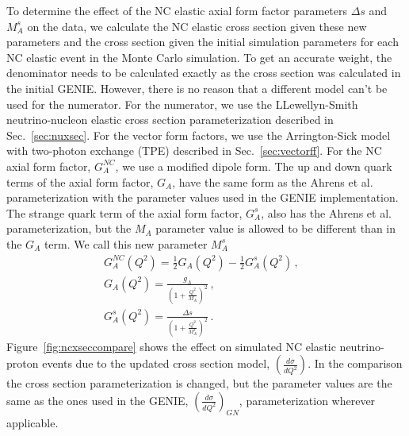     To determine the effect of the NC elastic axial form factor parameters
    $\Delta s$ and $M_A^s$ on the data, we calculate the NC elastic cross
    section given these new parameters and the cross section given the initial
    simulation parameters for each NC elastic event in the Monte Carlo
    simulation. To get an accurate weight, the denominator needs to be
    calculated exactly as the cross section was calculated in the initial
    GENIE. However, there is no reason that a different model can't be used for
    the numerator. For the numerator, we use the LLewellyn-Smith
    neutrino-nucleon elastic cross section parameterization described in
    Sec.~\ref{sec:nuxsec}. For the vector form factors, we use the
    Arrington-Sick model with two-photon exchange (TPE) described in
    Sec.~\ref{sec:vectorff}. For the NC axial form factor, $G_A^{NC}$, we use a
    modified dipole form. The up and down quark terms of the axial form factor,
    $G_A$, have the same form as the Ahrens et al.~\cite{Ahrens}
    parameterization with the parameter values used in the GENIE
    implementation. The strange quark term of the axial form factor, $G_A^s$,
    also has the Ahrens et al. parameterization, but the $M_A$ parameter value
    is allowed to be different than in the $G_A$ term. We call this new
    parameter $M_A^s$
    \begin{align}\label{eq:modifiedaxial}
      G_A^{NC}(Q^2) = \frac{1}{2}G_A(Q^2) - \frac{1}{2}G_A^s(Q^2) \,,& \\
      G_A(Q^2) = \frac{g_A}{(1+\frac{Q^2}{M_A})^2} \,,& \\
      G_A^s(Q^2) = \frac{\Delta s}{(1+\frac{Q^2}{M_A^s})^2} \,.&
    \end{align}
    Figure~\ref{fig:ncxseccompare} shows the effect on simulated NC elastic
    neutrino-proton events due to the updated cross section model,
    $\left(\frac{d\sigma}{dQ^2}\right)$. In the comparison the cross section
    parameterization is changed, but the parameter values are the same as the
    ones used in the GENIE, $\left(\frac{d\sigma}{dQ^2}\right)_{GN}$,
    parameterization wherever applicable.
